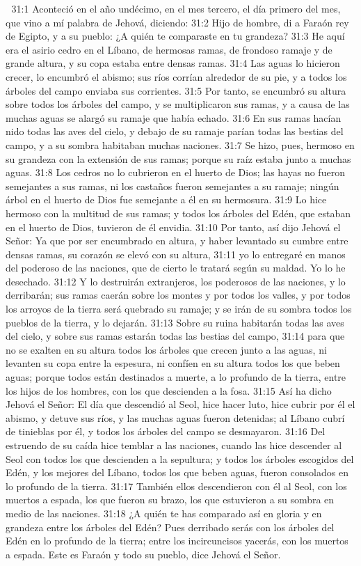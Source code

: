 
31:1 Aconteció en el año undécimo, en el mes tercero, el día primero del mes, que vino a mí palabra de Jehová, diciendo:  
31:2 Hijo de hombre, di a Faraón rey de Egipto, y a su pueblo: ¿A quién te comparaste en tu grandeza?  
31:3 He aquí era el asirio cedro en el Líbano, de hermosas ramas, de frondoso ramaje y de grande altura, y su copa estaba entre densas ramas.  
31:4 Las aguas lo hicieron crecer, lo encumbró el abismo; sus ríos corrían alrededor de su pie, y a todos los árboles del campo enviaba sus corrientes.  
31:5 Por tanto, se encumbró su altura sobre todos los árboles del campo, y se multiplicaron sus ramas, y a causa de las muchas aguas se alargó su ramaje que había echado.  
31:6 En sus ramas hacían nido todas las aves del cielo, y debajo de su ramaje parían todas las bestias del campo, y a su sombra habitaban muchas naciones.  
31:7 Se hizo, pues, hermoso en su grandeza con la extensión de sus ramas; porque su raíz estaba junto a muchas aguas.  
31:8 Los cedros no lo cubrieron en el huerto de Dios;  las hayas no fueron semejantes a sus ramas, ni los castaños fueron semejantes a su ramaje; ningún árbol en el huerto de Dios fue semejante a él en su hermosura.  
31:9 Lo hice hermoso con la multitud de sus ramas; y todos los árboles del Edén, que estaban en el huerto de Dios, tuvieron de él envidia.  
31:10 Por tanto, así dijo Jehová el Señor: Ya que por ser encumbrado en altura, y haber levantado su cumbre entre densas ramas, su corazón se elevó con su altura,  
31:11 yo lo entregaré en manos del poderoso de las naciones, que de cierto le tratará según su maldad. Yo lo he desechado.  
31:12 Y lo destruirán extranjeros, los poderosos de las naciones, y lo derribarán; sus ramas caerán sobre los montes y por todos los valles, y por todos los arroyos de la tierra será quebrado su ramaje; y se irán de su sombra todos los pueblos de la tierra, y lo dejarán.  
31:13 Sobre su ruina habitarán todas las aves del cielo, y sobre sus ramas estarán todas las bestias del campo,  
31:14 para que no se exalten en su altura todos los árboles que crecen junto a las aguas, ni levanten su copa entre la espesura, ni confíen en su altura todos los que beben aguas; porque todos están destinados a muerte, a lo profundo de la tierra, entre los hijos de los hombres, con los que descienden a la fosa.  
31:15 Así ha dicho Jehová el Señor: El día que descendió al Seol, hice hacer luto, hice cubrir por él el abismo, y detuve sus ríos, y las muchas aguas fueron detenidas; al Líbano cubrí de tinieblas por él, y todos los árboles del campo se desmayaron.  
31:16 Del estruendo de su caída hice temblar a las naciones, cuando las hice descender al Seol con todos los que descienden a la sepultura; y todos los árboles escogidos del Edén, y los mejores del Líbano, todos los que beben aguas, fueron consolados en lo profundo de la tierra.  
31:17 También ellos descendieron con él al Seol, con los muertos a espada, los que fueron su brazo, los que estuvieron a su sombra en medio de las naciones. 
31:18 ¿A quién te has comparado así en gloria y en grandeza entre los árboles del Edén? Pues derribado serás con los árboles del Edén en lo profundo de la tierra; entre los incircuncisos yacerás, con los muertos a espada. Este es Faraón y todo su pueblo, dice Jehová el Señor.  

